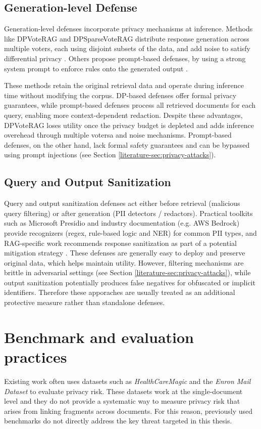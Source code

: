 \subsection{Generation-level Defense} Generation-level defenses incorporate privacy mechanisms at inference. Methods like DPVoteRAG and DPSparseVoteRAG distribute response generation across multiple voters, each using disjoint subsets of the data, and add noise to satisfy differential privacy \cite{DPVoteRAG}. Others propose prompt-based defenses, by using a strong system prompt to enforce rules onto the generated output \cite{anthropic_strengthen_guardrails,aws_secure_rag,goodAndBad}. 

These methods retain the original retrieval data and operate during inference time without modifying the corpus. DP-based defenses offer formal privacy guarantees, while prompt-based defenses process all retrieved documents for each query, enabling more context-dependent redaction. Despite these advantages, DPVoteRAG loses utility once the privacy budget is depleted and adds inference overehead through multiple votersa and noise mechanisms. Prompt-based defenses, on the other hand, lack formal safety guarantees and can be bypassed using prompt injections (see Section \ref{literature-sec:privacy-attacks}). 


\subsection{Query and Output Sanitization} Query and output sanitization defenses act either before retrieval (malicious query filtering) or after generation (\ac{PII} detectors / redactors). Practical toolkits such as Microsoft Presidio and industry documentation (e.g. AWS Bedrock) provide recognizers (regex, rule-based logic and NER) for common \ac{PII} types, and RAG-specific work recommends response sanitization as part of a potential mitigation strategy \cite{aws_bedrock_privacy,ragThief,microsoft_presidio}. These defenses are generally easy to deploy and preserve original data, which helps maintain utility. However, filtering mechanisms are brittle in adversarial settings (see Section \ref{literature-sec:privacy-attacks}), while  output sanitization potentially produces false negatives for obfuscated or implicit identifiers. Therefore these apporaches are usually treated as an additional protective measure rather than standalone defenses.


\section{Benchmark and evaluation practices}
Existing work often uses datasets such as  \textit{HealthCareMagic} and the \textit{Enron Mail Dataset} to evaluate privacy risk. These datasets work at the single-document level and they do not provide a systematic way to measure privacy risk that arises from linking fragments across documents. For this reason, previously used benchmarks do not directly address the key threat targeted in this thesis. 

